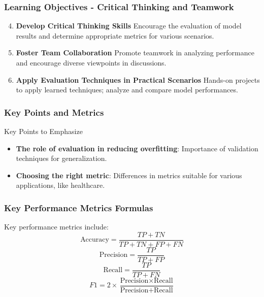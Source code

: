 \documentclass[aspectratio=169]{beamer}
\begin{document}
\begin{frame}[fragile]
    \frametitle{Learning Objectives - Critical Thinking and Teamwork}
    \begin{enumerate}
        \setcounter{enumi}{3}
        \item \textbf{Develop Critical Thinking Skills}  
        Encourage the evaluation of model results and determine appropriate metrics for various scenarios.

        \item \textbf{Foster Team Collaboration}  
        Promote teamwork in analyzing performance and encourage diverse viewpoints in discussions.

        \item \textbf{Apply Evaluation Techniques in Practical Scenarios}  
        Hands-on projects to apply learned techniques; analyze and compare model performances.
    \end{enumerate}
\end{frame}

\begin{frame}[fragile]
    \frametitle{Key Points and Metrics}
    \begin{block}{Key Points to Emphasize}
        \begin{itemize}
            \item \textbf{The role of evaluation in reducing overfitting}: Importance of validation techniques for generalization.
            \item \textbf{Choosing the right metric}: Differences in metrics suitable for various applications, like healthcare.
        \end{itemize}
    \end{block}
\end{frame}

\begin{frame}[fragile]
    \frametitle{Key Performance Metrics Formulas}
    Key performance metrics include:
    \begin{equation}
        \text{Accuracy} = \frac{TP + TN}{TP + TN + FP + FN}
    \end{equation}
    \begin{equation}
        \text{Precision} = \frac{TP}{TP + FP}
    \end{equation}
    \begin{equation}
        \text{Recall} = \frac{TP}{TP + FN}
    \end{equation}
    \begin{equation}
        F1 = 2 \times \frac{\text{Precision} \times \text{Recall}}{\text{Precision} + \text{Recall}}
    \end{equation}
\end{frame}
\end{document}
